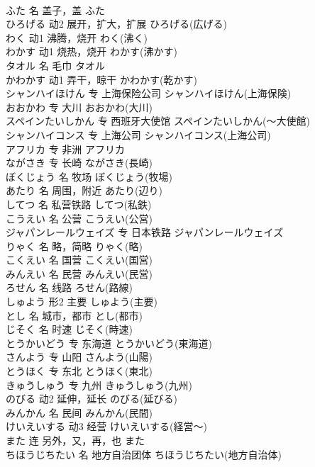 \documentclass[8pt]{extreport}
\begin{document}
\begin{CJK}{UTF8}{min}
\\	ふた	名	盖子，盖	ふた	
\\	ひろげる	动2	展开，扩大，扩展	ひろげる(広げる)	
\\	わく	动1	沸腾，烧开	わく(沸く)	
\\	わかす	动1	烧热，烧开	わかす(沸かす)	
\\	タオル	名	毛巾	タオル	
\\	かわかす	动1	弄干，晾干	かわかす(乾かす)	
\\	シャンハイほけん	专	上海保险公司	シャンハイほけん(上海保険)	
\\	おおかわ	专	大川	おおかわ(大川)	
\\	スペインたいしかん	专	西班牙大使馆	スペインたいしかん(～大使館)	
\\	シャンハイコンス	专	上海公司	シャンハイコンス(上海公司)	
\\	アフリカ	专	非洲	アフリカ	
\\	ながさき	专	长崎	ながさき(長崎)	
\\	ぼくじょう	名	牧场	ぼくじょう(牧場)	
\\	あたり	名	周围，附近	あたり(辺り)	
\\	してつ	名	私营铁路	してつ(私鉄)	
\\	こうえい	名	公营	こうえい(公営)	
\\	ジャパンレールウェイズ	专	日本铁路	ジャパンレールウェイズ
\\	りゃく	名	略，简略	りゃく(略)	
\\	こくえい	名	国营	こくえい(国営)	
\\	みんえい	名	民营	みんえい(民営)	
\\	ろせん	名	线路	ろせん(路線)	
\\	しゅよう	形2	主要	しゅよう(主要)	
\\	とし	名	城市，都市	とし(都市)	
\\	じそく	名	时速	じそく(時速)	
\\	とうかいどう	专	东海道	とうかいどう(東海道)	
\\	さんよう	专	山阳	さんよう(山陽)	
\\	とうほく	专	东北	とうほく(東北)	
\\	きゅうしゅう	专	九州	きゅうしゅう(九州)	
\\	のびる	动2	延伸，延长	のびる(延びる)	
\\	みんかん	名	民间	みんかん(民間)	
\\	けいえいする	动3	经营	けいえいする(経営～)	
\\	また	连	另外，又，再，也	また	
\\	ちほうじちたい	名	地方自治团体	ちほうじちたい(地方自治体)	

\end{CJK}
\end{document}

